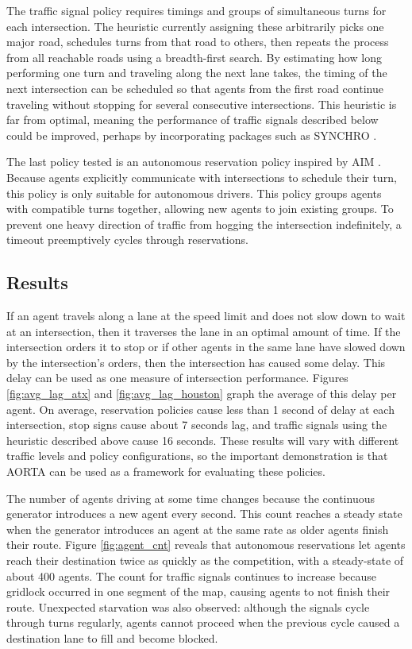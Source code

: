 \documentclass[letterpaper, 10 pt, conference]{ieeeconf}  %
\begin{document}
The traffic signal policy requires timings and groups of simultaneous turns for
each intersection. The heuristic currently assigning these arbitrarily picks one
major road, schedules turns from that road to others, then repeats the process
from all reachable roads using a breadth-first search. By estimating how long
performing one turn and traveling along the next lane takes, the timing of the
next intersection can be scheduled so that agents from the first road continue
traveling without stopping for several consecutive intersections. This heuristic
is far from optimal, meaning the performance of traffic signals described below
could be improved, perhaps by incorporating packages such as SYNCHRO
\cite{synchro}.

The last policy tested is an autonomous reservation policy inspired by AIM
\cite{JAIR08-dresner}. Because agents explicitly communicate with intersections
to schedule their turn, this policy is only suitable for autonomous drivers.
This policy groups agents with compatible turns together, allowing new agents to
join existing groups. To prevent one heavy direction of traffic from hogging the
intersection indefinitely, a timeout preemptively cycles through reservations.

\subsection{Results}


If an agent travels along a lane at the speed limit and does not slow down to
wait at an intersection, then it traverses the lane in an optimal amount of
time. If the intersection orders it to stop or if other agents in the same lane
have slowed down by the intersection's orders, then the intersection has caused
some delay. This delay can be used as one measure of intersection performance.
Figures \ref{fig:avg_lag_atx} and \ref{fig:avg_lag_houston} graph the average of
this delay per agent. On average, reservation policies cause less than 1 second
of delay at each intersection, stop signs cause about 7 seconds lag, and traffic
signals using the heuristic described above cause 16 seconds. These results will
vary with different traffic levels and policy configurations, so the important
demonstration is that AORTA can be used as a framework for evaluating these
policies.

The number of agents driving at some time changes because the continuous
generator introduces a new agent every second. This count reaches a steady
state when the generator introduces an agent at the same rate as older agents
finish their route. Figure \ref{fig:agent_cnt} reveals that autonomous
reservations let agents reach their destination twice as quickly as the
competition, with a steady-state of about 400 agents. The count for traffic
signals continues to increase because gridlock occurred in one segment of the
map, causing agents to not finish their route.  Unexpected starvation was also
observed: although the signals cycle through turns regularly, agents cannot
proceed when the previous cycle caused a destination lane to fill and become
blocked.
\end{document}
